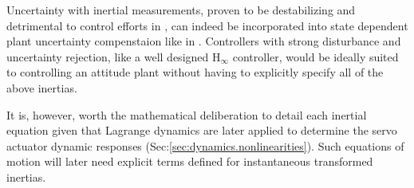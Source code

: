\par
Uncertainty with inertial measurements, proven to be destabilizing and detrimental to control efforts in \cite{inertiafree,inertiaspin}, can indeed be incorporated into state dependent plant uncertainty  compenstaion like in \cite{intelligentbackstep}. Controllers with strong disturbance and uncertainty rejection, like a well designed $\text{H}_\infty$ controller, would be ideally suited to controlling an attitude plant without having to explicitly specify all of the above inertias. 
\par
It is, however, worth the mathematical deliberation to detail each inertial equation given that Lagrange dynamics are later applied to determine the servo actuator dynamic responses (Sec:\ref{sec:dynamics.nonlinearities}). Such equations of motion will later need explicit terms defined for instantaneous transformed inertias.
\newpage
